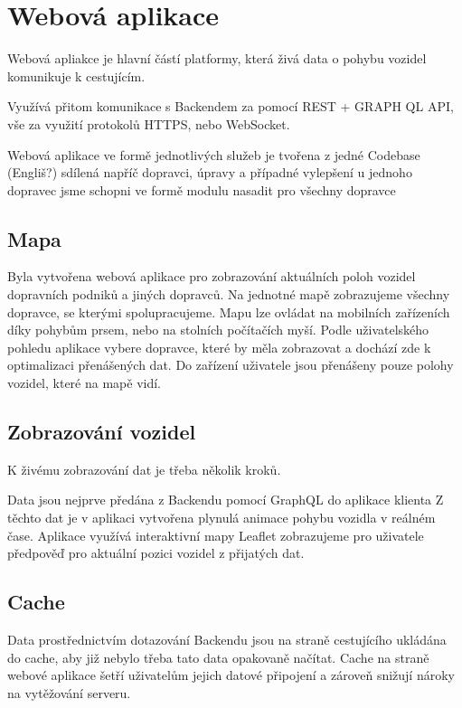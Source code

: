 \section{Webová aplikace}

Webová apliakce je hlavní částí platformy, která živá data o pohybu vozidel komunikuje k cestujícím.

Využívá přitom komunikace s Backendem za pomocí REST + GRAPH QL API, vše za využití protokolů HTTPS, nebo WebSocket.



Webová aplikace ve formě jednotlivých služeb je tvořena z jedné Codebase (Engliš?) sdílená napříč dopravci, úpravy a případné vylepšení u jednoho dopravec jsme schopni ve formě modulu nasadit pro všechny dopravce

\subsection{Mapa}
Byla vytvořena webová aplikace pro zobrazování aktuálních poloh vozidel dopravních podniků a jiných dopravců.
Na jednotné mapě zobrazujeme všechny dopravce, se kterými spolupracujeme.
Mapu lze ovládat na mobilních zařízeních díky pohybům prsem, nebo na stolních počítačích myší. Podle uživatelského pohledu aplikace vybere dopravce, které by měla zobrazovat a dochází zde k optimalizaci přenášených dat. Do zařízení uživatele jsou přenášeny pouze polohy vozidel, které na mapě vidí.

\subsection{Zobrazování vozidel}
K živému zobrazování dat je třeba několik kroků.

Data jsou nejprve předána z Backendu pomocí GraphQL do aplikace klienta
Z těchto dat je v aplikaci vytvořena plynulá animace pohybu vozidla v reálném čase.
Aplikace využívá interaktivní mapy Leaflet zobrazujeme pro uživatele předpověď pro aktuální pozici vozidel z přijatých dat.



\subsection{Cache}
Data prostřednictvím dotazování Backendu jsou na straně cestujícího ukládána do cache, aby již nebylo třeba tato data opakovaně načítat. Cache na straně webové aplikace šetří uživatelům jejich datové připojení a zároveň snižují nároky na vytěžování serveru.

